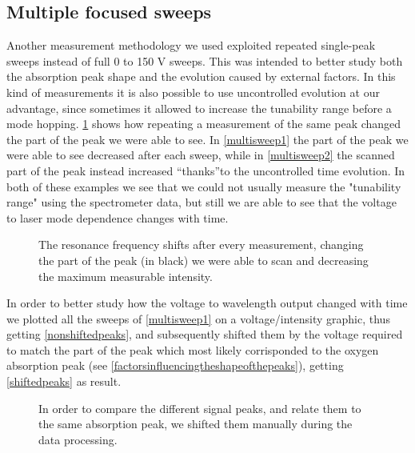 	\subsection{Multiple focused sweeps}\label{focus}
Another measurement methodology we used exploited repeated single-peak sweeps instead of 
full 0 to 150 V sweeps. This was intended to better study both the absorption peak shape and the evolution caused by external factors. In this kind of measurements it is also possible to use uncontrolled evolution at our advantage, since sometimes it allowed to increase the tunability range before a mode hopping. \cref{multisweep} shows how repeating a measurement of the same peak changed the part of the peak we were able to see. In \cref{multisweep1} the part of the peak we were able to see decreased after each sweep, while in \cref{multisweep2} the scanned part of the peak instead increased \textquotedblleft thanks\textquotedblright to the uncontrolled time evolution.
In both of these examples we see that we could not usually measure the "tunability range" using the spectrometer data, but still we are able to see that the voltage to laser mode dependence changes with time. 

\begin{figure}[!phtb]\centering
{}
\caption{The resonance frequency shifts after every measurement, changing the part of the peak (in black) we were able to scan and decreasing the maximum measurable intensity.}
\label{multisweep}
\end{figure}

In order to better study how the voltage to wavelength output changed with time we plotted all the sweeps of \cref{multisweep1} on a voltage/intensity graphic, thus getting \cref{nonshiftedpeaks}, and subsequently shifted them by the voltage required to match the part of the peak which most likely corrisponded to the oxygen absorption peak (see \cref{factorsinfluencingtheshapeofthepeaks}), getting \cref{shiftedpeaks} as result.

\begin{figure}
\caption{In order to compare the different signal peaks, and relate them to the same absorption peak, we shifted them manually during the data processing.}
\label{grafishifti}
\end{figure}

